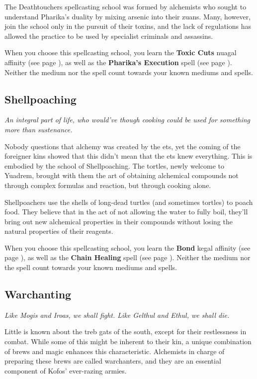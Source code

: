     The Deathtouchers spellcasting school was formed by alchemists who sought to understand Pharika's duality by mixing arsenic into their zuans.
    Many, however, join the school only in the pursuit of their toxins, and the lack of regulations has allowed the practice to be used by specialist criminals and assassins.

    When you choose this spellcasting school, you learn the \textbf{Toxic Cuts} nuagal affinity (see page \pageref{medium::toxiccuts}), as well as the \textbf{Pharika's Execution} spell (see page \pageref{spell::pharikasexecution}).
    Neither the medium nor the spell count towards your known mediums and spells.

\subsection*{Shellpoaching} \label{ssec::shellpoaching} %
    \textit{An integral part of life, who would've though cooking could be used for something more than sustenance.}

    Nobody questions that alchemy was created by the ets, yet the coming of the foreigner kins showed that this didn't mean that the ets knew everything.
    This is embodied by the school of Shellpoaching.
    The tortles, newly welcome to Yuadrem, brought with them the art of obtaining alchemical compounds not through complex formulas and reaction, but through cooking alone.

    Shellpoachers use the shells of long-dead turtles (and sometimes tortles) to poach food.
    They believe that in the act of not allowing the water to fully boil, they'll bring out new alchemical properties in their compounds without losing the natural properties of their reagents.

    When you choose this spellcasting school, you learn the \textbf{Bond} kegal affinity (see page \pageref{medium::bond}), as well as the \textbf{Chain Healing} spell (see page \pageref{spell::chainhealing}).
    Neither the medium nor the spell count towards your known mediums and spells.

\subsection*{Warchanting} \label{ssec::warchanting}
    \textit{Like Mogis and Iroas, we shall fight.
    Like Gelthul and Ethul, we shall die.}

    Little is known about the treb gats of the south, except for their restlessness in combat.
    While some of this might be inherent to their kin, a unique combination of brews and magic enhances this characteristic.
    Alchemists in charge of preparing these brews are called warchanters, and they are an essential component of Kofos' ever-razing armies.


